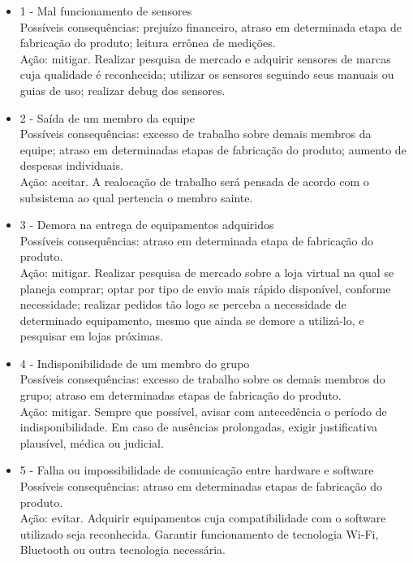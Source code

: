\begin{itemize}
	\item 1 - Mal funcionamento de sensores \\
	Possíveis consequências: prejuízo financeiro, atraso em determinada etapa de fabricação do produto; leitura errônea de medições. \\
	Ação: mitigar. Realizar pesquisa de mercado e adquirir sensores de marcas cuja qualidade é reconhecida; utilizar os sensores seguindo seus manuais ou guias de uso; realizar debug dos sensores.
	
	\item 2 - Saída de um membro da equipe \\
	Possíveis consequências: excesso  de trabalho sobre demais membros da equipe; atraso em determinadas etapas de fabricação do produto; aumento de despesas individuais. \\
	Ação: aceitar. A realocação de trabalho será pensada de acordo com o subsistema ao qual pertencia o membro sainte.
	
	\item 3 - Demora na entrega de equipamentos adquiridos \\
	Possíveis consequências:  atraso em determinada etapa de fabricação do produto. \\
	Ação: mitigar. Realizar pesquisa de mercado sobre a loja virtual na qual se planeja comprar; optar por tipo de envio mais rápido disponível, conforme necessidade; realizar pedidos tão logo se perceba a necessidade de determinado equipamento, mesmo que ainda se demore a utilizá-lo, e pesquisar em lojas próximas.
	
	\item 4 - Indisponibilidade de um membro do grupo \\
	Possíveis consequências: excesso de trabalho sobre os demais membros do grupo; atraso em determinadas etapas de fabricação do produto. \\
	Ação: mitigar. Sempre que possível, avisar com antecedência o período de indisponibilidade. Em caso de ausências prolongadas, exigir justificativa plausível, médica ou judicial.
	
	\item 5 - Falha ou impossibilidade de comunicação entre hardware e software \\
	Possíveis consequências: atraso em determinadas etapas de fabricação do produto. \\
	Ação: evitar. Adquirir equipamentos cuja compatibilidade com o software utilizado seja reconhecida. Garantir funcionamento de tecnologia Wi-Fi, Bluetooth ou outra tecnologia necessária.
	

\end{itemize}
